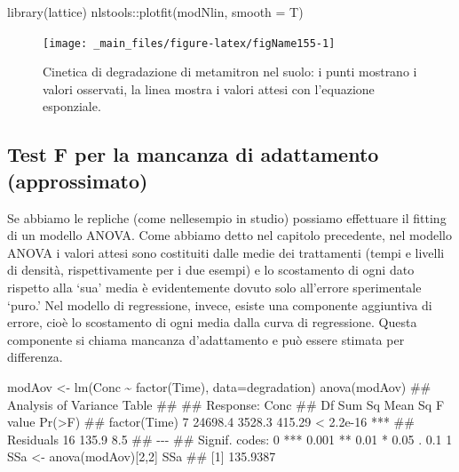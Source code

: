 \documentclass[a4paper,12pt,oneside]{book}
\newenvironment{Shaded}{\begin{snugshade}}{\end{snugshade}}
\newcommand{\DecValTok}[1]{#1}
\newcommand{\SpecialCharTok}[1]{#1}
\newcommand{\DocumentationTok}[1]{#1}
\newcommand{\OtherTok}[1]{#1}
\newcommand{\FunctionTok}[1]{#1}
\newcommand{\AttributeTok}[1]{#1}
\newcommand{\NormalTok}[1]{#1}
\begin{document}
\begin{Shaded}
\begin{Highlighting}[]
\FunctionTok{library}\NormalTok{(lattice)}
\NormalTok{nlstools}\SpecialCharTok{::}\FunctionTok{plotfit}\NormalTok{(modNlin, }\AttributeTok{smooth =}\NormalTok{ T)}
\end{Highlighting}
\end{Shaded}

\begin{figure}

{\centering \texttt{[image: \_main\_files/figure-latex/figName155-1]} 

}

\caption{Cinetica di degradazione di metamitron nel suolo: i punti mostrano i valori osservati, la linea mostra i valori attesi con l'equazione esponziale.}\label{fig:figName155}
\end{figure}

\hypertarget{test-f-per-la-mancanza-di-adattamento-approssimato}{%
\subsection{Test F per la mancanza di adattamento (approssimato)}\label{test-f-per-la-mancanza-di-adattamento-approssimato}}

Se abbiamo le repliche (come nellesempio in studio) possiamo effettuare il fitting di un modello ANOVA. Come abbiamo detto nel capitolo precedente, nel modello ANOVA i valori attesi sono costituiti dalle medie dei trattamenti (tempi e livelli di densità, rispettivamente per i due esempi) e lo scostamento di ogni dato rispetto alla `sua' media è evidentemente dovuto solo all'errore sperimentale `puro.' Nel modello di regressione, invece, esiste una componente aggiuntiva di errore, cioè lo scostamento di ogni media dalla curva di regressione. Questa componente si chiama mancanza d'adattamento e può essere stimata per differenza.

\begin{Shaded}
\begin{Highlighting}[]
\NormalTok{modAov }\OtherTok{\textless{}{-}} \FunctionTok{lm}\NormalTok{(Conc }\SpecialCharTok{\textasciitilde{}} \FunctionTok{factor}\NormalTok{(Time), }\AttributeTok{data=}\NormalTok{degradation)}
\FunctionTok{anova}\NormalTok{(modAov)}
\DocumentationTok{\#\# Analysis of Variance Table}
\DocumentationTok{\#\# }
\DocumentationTok{\#\# Response: Conc}
\DocumentationTok{\#\#              Df  Sum Sq Mean Sq F value    Pr(\textgreater{}F)    }
\DocumentationTok{\#\# factor(Time)  7 24698.4  3528.3  415.29 \textless{} 2.2e{-}16 ***}
\DocumentationTok{\#\# Residuals    16   135.9     8.5                      }
\DocumentationTok{\#\# {-}{-}{-}}
\DocumentationTok{\#\# Signif. codes:  0 \textquotesingle{}***\textquotesingle{} 0.001 \textquotesingle{}**\textquotesingle{} 0.01 \textquotesingle{}*\textquotesingle{} 0.05 \textquotesingle{}.\textquotesingle{} 0.1 \textquotesingle{} \textquotesingle{} 1}
\NormalTok{SSa }\OtherTok{\textless{}{-}} \FunctionTok{anova}\NormalTok{(modAov)[}\DecValTok{2}\NormalTok{,}\DecValTok{2}\NormalTok{]}
\NormalTok{SSa}
\DocumentationTok{\#\# [1] 135.9387}
\end{Highlighting}
\end{Shaded}
\end{document}
